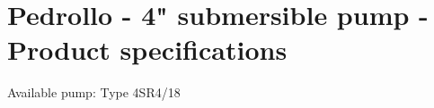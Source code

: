 \chapter{Pedrollo - 4" submersible pump - Product specifications}
\label{chapter:Pedrollo_product_specs}

Available pump: Type 4SR4/18


